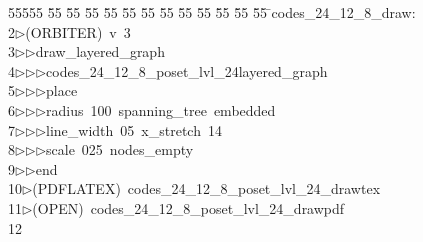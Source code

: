 %
%
\begin{tabbing}
55555 \= 55 \= 55 \= 55 \= 55 \= 55 \= 55 \= 55 \= 55 \= 55 \= 55 \= 55 \= 55 \= \>codes\_24\_12\_8\_draw:\\[0pt]
2\>$\triangleright$\>(ORBITER)\ v\ 3\ \\[0pt]
3\>$\triangleright$\>$\triangleright$\>draw\_layered\_graph\ \\[0pt]
4\>$\triangleright$\>$\triangleright$\>$\triangleright$\>codes\_24\_12\_8\_poset\_lvl\_24layered\_graph\ \\[0pt]
5\>$\triangleright$\>$\triangleright$\>$\triangleright$\>place\ \\[0pt]
6\>$\triangleright$\>$\triangleright$\>$\triangleright$\>radius\ 100\ spanning\_tree\ embedded\ \\[0pt]
7\>$\triangleright$\>$\triangleright$\>$\triangleright$\>line\_width\ 05\ x\_stretch\ 14\ \\[0pt]
8\>$\triangleright$\>$\triangleright$\>$\triangleright$\>scale\ 025\ nodes\_empty\ \\[0pt]
9\>$\triangleright$\>$\triangleright$\>end\\[0pt]
10\>$\triangleright$\>(PDFLATEX)\ codes\_24\_12\_8\_poset\_lvl\_24\_drawtex\\[0pt]
11\>$\triangleright$\>(OPEN)\ codes\_24\_12\_8\_poset\_lvl\_24\_drawpdf\\[0pt]
12\>\end{tabbing}
